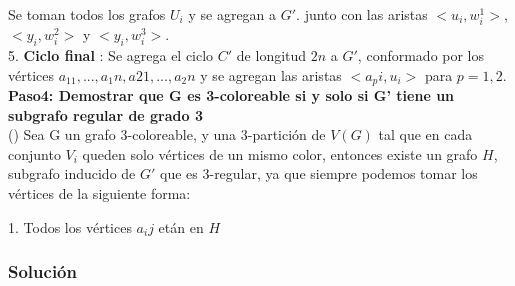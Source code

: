 \documentclass[
10pt, %
a4paper, %
oneside, %
headinclude,footinclude, %
BCOR5mm, %
]{scrartcl}
\begin{document}
Se toman todos los grafos $U_i$ y se agregan a $G'$. junto con las aristas $<u_i,w^1_i>$, $<y_i, w^2_i>$ y $<y_i, w^3_i>$.\\


5. \textbf{Ciclo final} : Se agrega el ciclo $C'$ de longitud $2n$ a $G'$, conformado por los vértices ${a_11,..., a_1n, a21,..., a_2n}$ y se agregan las aristas $<a_pi, u_i>$ para $p = 1,2$.\\


\textbf{Paso4: Demostrar que G es 3-coloreable si y solo si G' tiene un subgrafo regular de grado 3  }\\

(\Rightarrow ) Sea G un grafo 3-coloreable, y una 3-partición de $V(G)$ tal que en cada conjunto $V_i$ queden solo vértices de un mismo color, entonces existe un grafo $H$, 
subgrafo inducido de $G'$ que es 3-regular, ya que siempre podemos tomar los vértices de la siguiente forma:

1. Todos los vértices $a_ij$ etán en $H$







\subsubsection{Solución}




\renewcommand{\refname}{\spacedlowsmallcaps{References}} %




\end{document}
